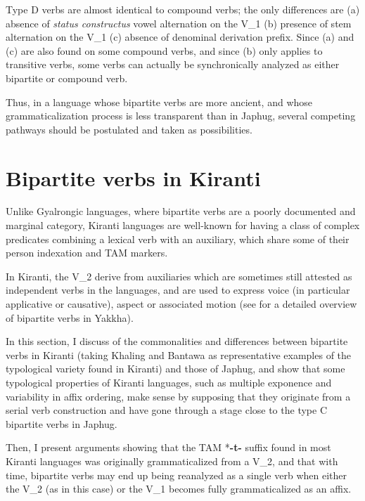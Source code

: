 \documentclass[oneside,a4paper,11pt]{article}
\newcommand{\ipa}[1]{{\phon\textbf{#1}}}
\begin{document}
Type D verbs are almost identical to compound verbs; the only differences are (a)  absence of \textit{status constructus} vowel alternation on the V_1 (b) presence of stem alternation on the V_1 (c) absence of denominal derivation prefix. Since (a) and (c) are also found on some compound verbs, and since (b) only applies to transitive verbs, some verbs can actually be synchronically analyzed as either bipartite or compound verb.

Thus, in a language whose bipartite verbs are more ancient, and whose grammaticalization process is less transparent than in Japhug, several competing pathways should be postulated and taken as possibilities.

\section{Bipartite verbs in Kiranti} \label{sec:kiranti.bipart}
Unlike Gyalrongic languages, where bipartite verbs are a poorly documented and marginal category, Kiranti languages are well-known for having a class of complex predicates combining a lexical verb with an auxiliary, which share some of their person indexation and TAM markers. 

In Kiranti, the V_2 derive from auxiliaries which are sometimes still attested as independent verbs in the languages, and are used to express voice (in particular applicative or causative), aspect or associated motion (see \citealt[283-328]{schackow15yakkha} for a detailed overview of bipartite verbs in Yakkha).

In this section, I discuss of the commonalities and differences between bipartite verbs in Kiranti (taking Khaling and Bantawa as representative examples of the typological variety found in Kiranti) and those of Japhug, and show that some typological properties of Kiranti languages, such as multiple exponence and variability in affix ordering, make sense by supposing that they originate from a serial verb construction and have gone through a stage close to the type C bipartite verbs in Japhug.

 Then, I present arguments showing that the TAM *\ipa{-t-} suffix found in most Kiranti languages was originally grammaticalized from a V_2, and that with time, bipartite verbs may end up being reanalyzed as a single verb when either the V_2 (as in this case) or the V_1 becomes fully grammaticalized as an affix.
\end{document}
